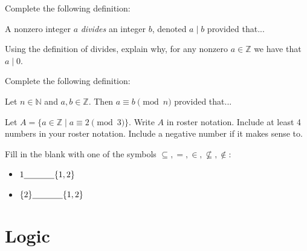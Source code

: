 \documentclass[11pt,answers]{exam}
\newcommand{\Z}{\mathbb{Z}}
\newcommand{\N}{\mathbb{N}}
\begin{document}
\begin{questions}


\question Complete the following definition:
\begin{center}
A nonzero integer $a$ \emph{divides} an integer $b$, denoted $a\mid b$ provided that...
\end{center}
\vfill

\question Using the definition of divides, explain why, for any nonzero $a\in\Z$ we have that $a\mid 0$.
\vfill

\question Complete the following definition:
\begin{center}
Let $n\in\N$ and $a,b\in\Z$. Then $a\equiv b \pmod{n}$ provided that...
\end{center}

\vfill


\question Let $A = \{a \in\Z \mid a\equiv 2 \pmod{3}\}$. Write $A$ in roster notation. Include at least 4 numbers in your roster notation. Include a negative number if it makes sense to.
\vfill


\question Fill in the blank with one of the symbols $\subseteq, =, \in, \not\subseteq, \not\in$:
	\begin{itemize}
	\item $1 \underline{\hspace{.5in}} \{1,2\}$\\
	
	\item $\{2\} \underline{\hspace{.5in}} \{1,2\}$
	\end{itemize}
\end{questions}
\newpage


\section{Logic}
\end{document}
